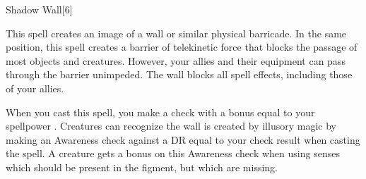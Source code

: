 \begin{spellsection}{Shadow Wall}[6]
    \begin{spellheader}
    \end{spellheader}
    \begin{spellcontent}
        \begin{spelltargetinginfo}
        \end{spelltargetinginfo}
        \begin{spelleffects}
            \spelleffect This spell creates an image of a wall or similar physical barricade.
            In the same position, this spell creates a barrier of telekinetic force that blocks the passage of most objects and creatures.
            However, your allies and their equipment can pass through the barrier unimpeded.
            The wall blocks all spell effects, including those of your allies.

            When you cast this spell, you make a check with a bonus equal to your spellpower . Creatures can recognize the wall is created by illusory magic by making an Awareness check against a DR equal to your check result when casting the spell. A creature gets a  bonus on this Awareness check when using senses which should be present in the figment, but which are missing.
            \spelldur \durshort
        \end{spelleffects}
    \end{spellcontent}
    \begin{spellfooter}
        \miscastexplode
    \end{spellfooter}
\end{spellsection}

